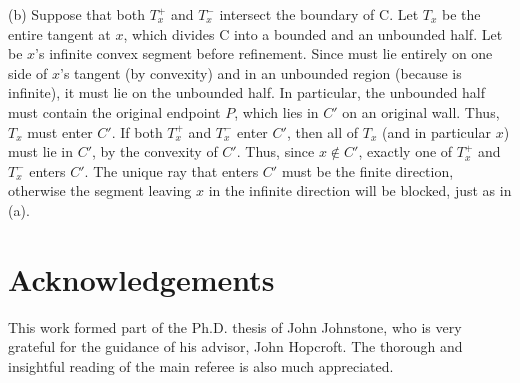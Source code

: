 (b) Suppose that both $T_{x}^{+}$ and $T_{x}^{-}$ intersect the boundary of C.
Let $T_{x}$ be the entire tangent at $x$, which 
divides C into a bounded and an unbounded half.
Let  be $x$'s infinite convex segment before refinement.
Since  must lie entirely on one side of $x$'s tangent (by convexity)
and in an unbounded region (because  is infinite), it must lie
on the unbounded half.
In particular, the unbounded half must contain the original endpoint $P$, which
lies in $C'$ on an original wall.
Thus, $T_{x}$ must enter $C'$.
If both $T_{x}^{+}$ and $T_{x}^{-}$ enter $C'$, then 
all of $T_{x}$ (and in particular $x$) must lie in $C'$, by the
convexity of $C'$.
Thus, since $x \not\in C'$, exactly one of $T_{x}^{+}$ and $T_{x}^{-}$
enters $C'$.
The unique ray that enters $C'$ must be the finite direction, otherwise 
the segment leaving $x$ in the infinite direction will be blocked, just as in (a).
\QED


\section{Acknowledgements}
This work formed part of the Ph.D. thesis of John Johnstone, who is very grateful for
the guidance of his advisor, John Hopcroft.
The thorough and insightful reading of the main referee is also much appreciated.
%


